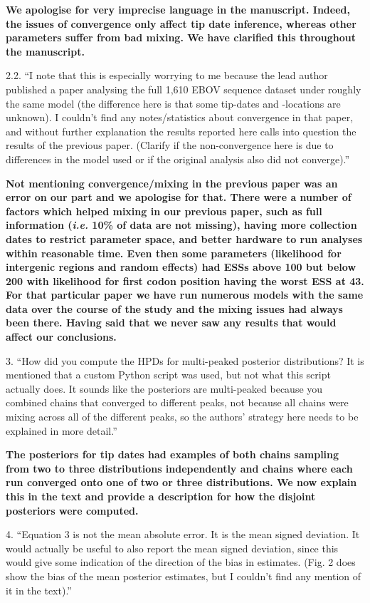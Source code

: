 \documentclass[11pt,oneside,letterpaper]{article}
\begin{document}
\textbf{We apologise for very imprecise language in the manuscript. Indeed, the issues of convergence only affect tip date inference, whereas other parameters suffer from bad mixing. We have clarified this throughout the manuscript.}

2.2. ``I note that this is especially worrying to me because the lead author published a paper analysing the full 1,610 EBOV sequence dataset under roughly the same model (the difference here is that some tip-dates and -locations are unknown). I couldn't find any notes/statistics about convergence in that paper, and without further explanation the results reported here calls into question the results of the previous paper. (Clarify if the non-convergence here is due to differences in the model used or if the original analysis also did not converge).''

\textbf{Not mentioning convergence/mixing in the previous paper was an error on our part and we apologise for that. There were a number of factors which helped mixing in our previous paper, such as full information (\textit{i.e.} 10\% of data are not missing), having more collection dates to restrict parameter space, and better hardware to run analyses within reasonable time. Even then some parameters (likelihood for intergenic regions and random effects) had ESSs above 100 but below 200 with likelihood for first codon position having the worst ESS at 43. For that particular paper we have run numerous models with the same data over the course of the study and the mixing issues had always been there. Having said that we never saw any results that would affect our conclusions.}

3. ``How did you compute the HPDs for multi-peaked posterior distributions? It is mentioned that a custom Python script was used, but not what this script actually does. It sounds like the posteriors are multi-peaked because you combined chains that converged to different peaks, not because all chains were mixing across all of the different peaks, so the authors' strategy here needs to be explained in more detail.''

\textbf{The posteriors for tip dates had examples of both chains sampling from two to three distributions independently and chains where each run converged onto one of two or three distributions. We now explain this in the text and provide a description for how the disjoint posteriors were computed.}

4. ``Equation 3 is not the mean absolute error. It is the mean signed deviation. It would actually be useful to also report the mean signed deviation, since this would give some indication of the direction of the bias in estimates. (Fig. 2 does show the bias of the mean posterior estimates, but I couldn't find any mention of it in the text).''
\end{document}
